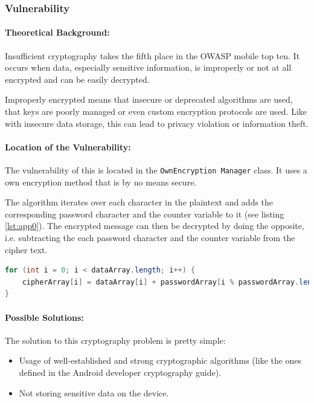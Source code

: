 \subsubsection{Vulnerability}
\paragraph{Theoretical Background:}
Insufficient cryptography takes the fifth place in the OWASP mobile top ten. It occurs when data, especially sensitive information, is improperly or not at all encrypted and can be easily decrypted. 

Improperly encrypted means that insecure or deprecated algorithms are used, that keys are poorly managed or even custom encryption protocols are used. Like with insecure data storage, this can lead to privacy violation or information theft.

\paragraph{Location of the Vulnerability:} \label{sec:app1-vulnerability}
The vulnerability of this is located in the \texttt{OwnEncryption Manager} class. It uses a own encryption method that is by no means secure. 

The algorithm iterates over each character in the plaintext and adds the corresponding password character and the counter variable to it (see listing \ref{lst:app0}). The encrypted message can then be decrypted by doing the opposite, i.e. subtracting the each password character and the counter variable from the cipher text.

\begin{lstlisting}[language=Java, label={lst:app0}]
for (int i = 0; i < dataArray.length; i++) {
    cipherArray[i] = dataArray[i] + passwordArray[i % passwordArray.length] + i;
}
\end{lstlisting}


\paragraph{Possible Solutions:}
The solution to this cryptography problem is pretty simple:
\begin{itemize}
	\item Usage of well-established and strong cryptographic algorithms (like the ones defined in the Android developer cryptography guide).
	\item Not storing sensitive data on the device.
\end{itemize}


